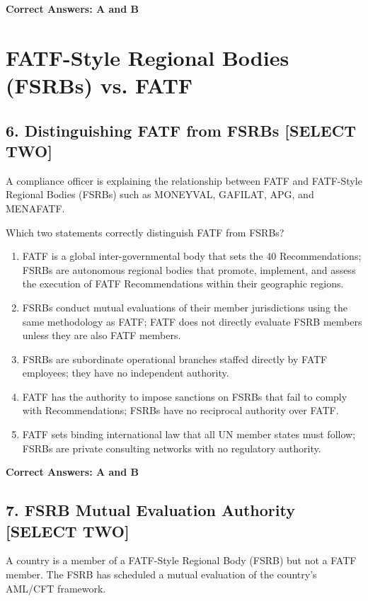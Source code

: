 \documentclass[11pt,a4paper]{article}
\begin{document}
	\textbf{Correct Answers: A and B}
	
	\section{FATF-Style Regional Bodies (FSRBs) vs. FATF}
	
	\subsection{6. Distinguishing FATF from FSRBs \textnormal{[SELECT TWO]}}
	
	A compliance officer is explaining the relationship between FATF and FATF-Style Regional Bodies (FSRBs) such as MONEYVAL, GAFILAT, APG, and MENAFATF.
	
	Which two statements correctly distinguish FATF from FSRBs?
	
	\begin{enumerate}[label=\Alph*.]
		\item FATF is a global inter-governmental body that sets the 40 Recommendations; FSRBs are autonomous regional bodies that promote, implement, and assess the execution of FATF Recommendations within their geographic regions.
		\item FSRBs conduct mutual evaluations of their member jurisdictions using the same methodology as FATF; FATF does not directly evaluate FSRB members unless they are also FATF members.
		\item FSRBs are subordinate operational branches staffed directly by FATF employees; they have no independent authority.
		\item FATF has the authority to impose sanctions on FSRBs that fail to comply with Recommendations; FSRBs have no reciprocal authority over FATF.
		\item FATF sets binding international law that all UN member states must follow; FSRBs are private consulting networks with no regulatory authority.
	\end{enumerate}
	
	\textbf{Correct Answers: A and B}
	
	\subsection{7. FSRB Mutual Evaluation Authority \textnormal{[SELECT TWO]}}
	
	A country is a member of a FATF-Style Regional Body (FSRB) but not a FATF member. The FSRB has scheduled a mutual evaluation of the country's AML/CFT framework.
	
\end{document}
